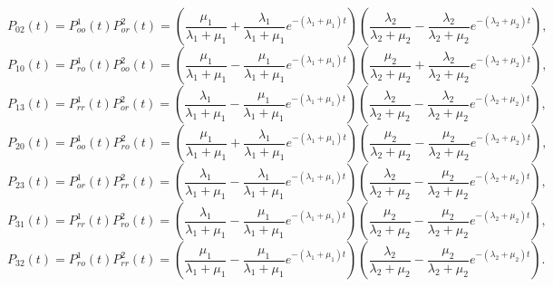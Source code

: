 \documentclass{amsart}
\theoremstyle{plain}
\theoremstyle{definition}
\begin{document}
\[P_{02}(t) = P^1_{oo}(t)P^2_{or}(t) = \left(\frac{\mu_1}{\lambda_1 + \mu_1} + \frac{\lambda_1}{\lambda_1 + \mu_1}e^{-(\lambda_1 + \mu_1)t} \right)\left(\frac{\lambda_2}{\lambda_2 + \mu_2} - \frac{\lambda_2}{\lambda_2 + \mu_2}e^{-(\lambda_2 + \mu_2)t}\right),
\]
\[P_{10}(t) = P^1_{ro}(t)P^2_{oo}(t) = \left(\frac{\mu_1}{\lambda_1 + \mu_1} - \frac{\mu_1}{\lambda_1 + \mu_1}e^{-(\lambda_1 + \mu_1)t} \right)\left( \frac{\mu_2}{\lambda_2 + \mu_2} + \frac{\lambda_2}{\lambda_2 + \mu_2}e^{-(\lambda_2 + \mu_2)t}\right),
\]
\[P_{13}(t) = P^1_{rr}(t)P^2_{or}(t) = \left( \frac{\lambda_1}{\lambda_1 + \mu_1} - \frac{\mu_1}{\lambda_1 + \mu_1}e^{-(\lambda_1 + \mu_1)t}\right)\left(\frac{\lambda_2}{\lambda_2 + \mu_2} - \frac{\lambda_2}{\lambda_2 + \mu_2}e^{-(\lambda_2 + \mu_2)t}\right),  
\]
\[P_{20}(t) = P^1_{oo}(t)P^2_{ro}(t) = \left(\frac{\mu_1}{\lambda_1 + \mu_1} + \frac{\lambda_1}{\lambda_1 + \mu_1}e^{-(\lambda_1 + \mu_1)t}\right)\left( \frac{\mu_2}{\lambda_2 + \mu_2} - \frac{\mu_2}{\lambda_2 + \mu_2}e^{-(\lambda_2 + \mu_2)t}\right),
\]
\[P_{23}(t) = P^1_{or}(t)P^2_{rr}(t) = \left( \frac{\lambda_1}{\lambda_1 + \mu_1} - \frac{\lambda_1}{\lambda_1 + \mu_1}e^{-(\lambda_1 + \mu_1)t}\right)\left(\frac{\lambda_2}{\lambda_2 + \mu_2} - \frac{\mu_2}{\lambda_2 + \mu_2}e^{-(\lambda_2 + \mu_2)t}\right),
\]
\[P_{31}(t) = P^1_{rr}(t)P^2_{ro}(t) = \left( \frac{\lambda_1}{\lambda_1 + \mu_1} - \frac{\mu_1}{\lambda_1 + \mu_1}e^{-(\lambda_1 + \mu_1)t}\right)\left( \frac{\mu_2}{\lambda_2 + \mu_2} - \frac{\mu_2}{\lambda_2 + \mu_2}e^{-(\lambda_2 + \mu_2)t}\right),
\]
\[P_{32}(t) = P^1_{ro}(t)P^2_{rr}(t) = \left(\frac{\mu_1}{\lambda_1 + \mu_1} - \frac{\mu_1}{\lambda_1 + \mu_1}e^{-(\lambda_1 + \mu_1)t}\right)\left(\frac{\lambda_2}{\lambda_2 + \mu_2} - \frac{\mu_2}{\lambda_2 + \mu_2}e^{-(\lambda_2 + \mu_2)t}\right).\]
\end{document}
